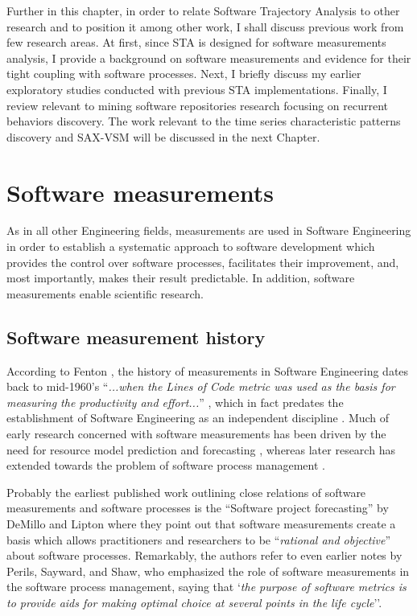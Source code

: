 Further in this chapter, in order to relate Software Trajectory Analysis to other research and to position 
it among other work, I shall discuss previous work from few research areas.
At first, since STA is designed for software measurements analysis, I provide a background on software 
measurements and evidence for their tight coupling with software processes. 
Next, I briefly discuss my earlier exploratory studies conducted with previous STA implementations. 
Finally, I review relevant to mining software repositories research focusing on recurrent behaviors discovery.
The work relevant to the time series characteristic patterns discovery and SAX-VSM will be discussed 
in the next Chapter.

\section{Software measurements}
As in all other Engineering fields, measurements are used in Software Engineering in order to establish a 
systematic approach to software development which provides the control over software processes, facilitates
their improvement, and, most importantly, makes their result predictable. 
In addition, software measurements enable scientific research.

\subsection{Software measurement history}
According to Fenton \cite{citeulike:1525462}, the history of measurements in Software Engineering dates 
back to mid-1960's  ``\textit{...when the Lines of Code metric was used as the basis for measuring the 
productivity and effort...}'' , which in fact predates the establishment of Software Engineering as an 
independent discipline \cite{naur_crisis_68}. 
Much of early research concerned with software measurements has been driven by the need for resource model 
prediction and forecasting \cite{citeulike:1525462}, whereas later research has extended towards the problem 
of software process management \cite{citeulike:13158802}.

Probably the earliest published work outlining close relations of software measurements and software 
processes is the ``Software project forecasting'' by DeMillo and Lipton \cite{demillo1980software} where they 
point out that software measurements create a basis which allows practitioners and researchers to be 
``\textit{rational and objective}'' about software processes. 
Remarkably, the authors refer to even earlier notes by Perils, Sayward, and Shaw, who emphasized the role of software 
measurements in the software process management, saying that `\textit{the purpose of software metrics is 
to provide aids for making optimal choice at several points in the life cycle}''.

